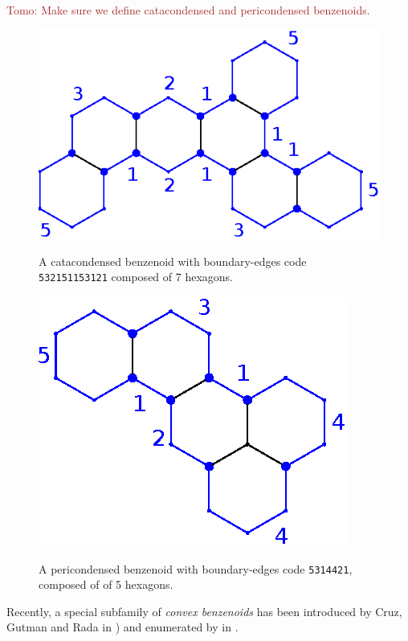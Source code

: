 \documentclass[a4paper,10pt]{article}
\newcommand\Tomo[1]{\textcolor{brown}{Tomo: #1}}
\begin{document}
\Tomo{Make sure we define catacondensed and pericondensed benzenoids.}

\begin{figure}
\centering
\includegraphics{figures/fig3}
\label{fig3}
\caption{A catacondensed benzenoid with boundary-edges code {\tt 532151153121} composed of 7 hexagons.}
\end{figure}



\begin{figure}
\centering
 \includegraphics{figures/fig1}
 \label{fig1}\quad
 \caption{ A pericondensed benzenoid with boundary-edges code {\tt 5314421}, composed of of 5 hexagons. } 
\end{figure}


Recently, a special subfamily of \emph{convex benzenoids} has been introduced by Cruz, Gutman and Rada in \cite{CruGutRad12})
and enumerated by in \cite{basic2017}.
\end{document}
